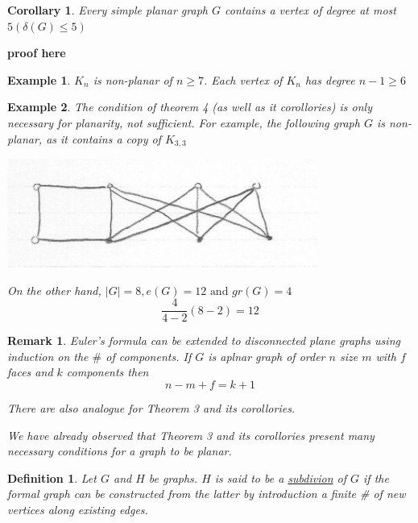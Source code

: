 \documentclass[12pt]{article}
\newtheorem*{corollary}{Corollary}
\newtheorem{example}{Example}
\newtheorem{definition}{Definition}
\newtheorem*{remark}{Remark}
\begin{document}
\begin{corollary}
	Every simple planar graph $G$ contains a vertex of degree at most $5 (\delta(G) \le 5)$
\end{corollary}

\textbf{proof here}



\begin{example}
	$K_{n}$ is non-planar of $n\ge 7$. Each vertex of $K_{n}$ has degree $n-1 \ge 6$
\end{example}

\begin{example}
	The condition of theorem 4 (as well as it corollories) is only necessary for planarity, not sufficient. For example, the following graph $G$ is non-planar, as it contains a copy of $K_{3,3}$

	\begin{center}
		\includegraphics[scale=0.5]{k3_non_planar}
	\end{center}

	On the other hand, $\vert G\vert =8, e(G) = 12 \text{ and } gr(G) = 4$
	\[\frac{4}{4-2} (8-2) = 12\]
\end{example}

\begin{remark}
	Euler's formula can be extended to disconnected plane graphs using induction on the $\#$ of components. If $G$ is aplnar graph of order $n$ size $m$ with $f$ faces and $k$ components then
	\[n- m + f = k +1\]

	There are also analogue for Theorem 3 and its corollories.

	We have already observed that Theorem 3 and its corollories present many necessary conditions for a graph to be planar.

\end{remark}


\begin{definition}
	Let $G$ and $H$ be graphs. $H$ is said to be a \underline{subdivion} of $G$ if the formal graph can be constructed from the latter by introduction a finite \# of new vertices along existing edges.
\end{definition}
\end{document}

